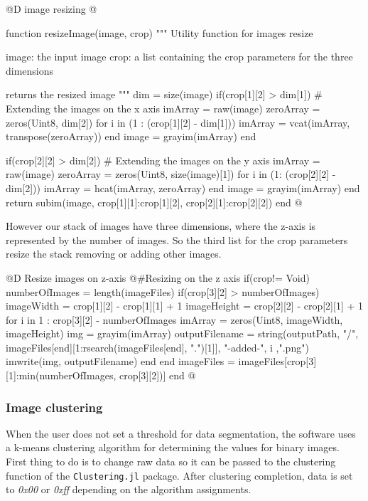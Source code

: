 \documentclass[11pt,oneside]{article}	%
\begin{document}
@D image resizing
@{function resizeImage(image, crop)
  """
  Utility function for images resize
  
  image: the input image
  crop: a list containing the crop parameters 
        for the three dimensions 
  
  returns the resized image
  """
  dim = size(image)
  if(crop[1][2] > dim[1])
    # Extending the images on the x axis
    imArray = raw(image)
    zeroArray = zeros(Uint8, dim[2])
    for i in (1 : (crop[1][2] - dim[1]))
      imArray = vcat(imArray, transpose(zeroArray))
    end
    image = grayim(imArray)
  end
  
  if(crop[2][2] > dim[2])
    # Extending the images on the y axis
    imArray = raw(image)
    zeroArray = zeros(Uint8, size(image)[1])
    for i in (1: (crop[2][2] - dim[2]))
      imArray = hcat(imArray, zeroArray)
    end
    image = grayim(imArray)
  end
  return subim(image, crop[1][1]:crop[1][2], crop[2][1]:crop[2][2])
end @}

However our stack of images have three dimensions, where the z-axis is represented by the number of images. So the third list for the crop parameters resize the stack removing or adding other images.

@D Resize images on z-axis
@{#Resizing on the z axis
if(crop!= Void)
  numberOfImages = length(imageFiles)
  if(crop[3][2] > numberOfImages)
    imageWidth = crop[1][2] - crop[1][1] + 1
    imageHeight = crop[2][2] - crop[2][1] + 1
    for i in 1 : crop[3][2] - numberOfImages
      imArray = zeros(Uint8, imageWidth, imageHeight)
      img = grayim(imArray)
      outputFilename = string(outputPath, "/", imageFiles[end][1:rsearch(imageFiles[end], ".")[1]],
			      "-added-", i ,".png")
      imwrite(img, outputFilename)
    end 
  end
  imageFiles = imageFiles[crop[3][1]:min(numberOfImages, crop[3][2])]
end @}

\subsubsection{Image clustering}\label{sec:imageClustering}

When the user does not set a threshold for data segmentation, the software uses a k-means clustering algorithm for determining the values for binary images. First thing to do is to change raw data so it can be passed to the clustering function of the \texttt{Clustering.jl} package. After clustering completion, data is set to \textit{0x00} or \textit{0xff} depending on the algorithm assignments.
\end{document}
